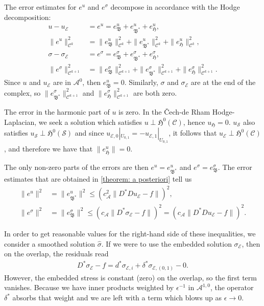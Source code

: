 \documentclass[reqno]{amsart}
\numberwithin{equation}{section}
\theoremstyle{definition}
\newcommand{\Ac}{\mathcal{A}}
\newcommand{\Cc}{\mathcal{C}}
\newcommand{\Ec}{\mathcal{E}}
\newcommand{\Sc}{\mathcal{S}}
\newcommand{\Hf}{\mathfrak{H}}
\newcommand{\Bf}{\mathfrak{B}}
\begin{document}
The error estimates for $e^u$ and $e^\sigma$ decompose in accordance with the Hodge decomposition:
\begin{subequations}
\begin{align}
u - u_\Ec &= e^u = e^u_\Bf + e^u_{\Bf^*}+ e^u_{\Hf}, \\
\|e^u\|^2_{\Cc^k} &= \|e^u_\Bf\|^2_{\Cc^k} + \|e^u_{\Bf^*}\|^2_{\Cc^k} + \|e^u_{\Hf}\|^2_{\Cc^k}, \\
\sigma - \sigma_\Ec &= e^\sigma = e^\sigma_\Bf + e^\sigma_{\Bf^*}+ e^\sigma_{\Hf}, \\
\|e^\sigma\|^2_{\Cc^{k+1}} &= \|e^\sigma_\Bf\|^2_{\Cc^{k+1}} + \|e^\sigma_{\Bf^*}\|^2_{\Cc^{k+1}} + \|e^\sigma_{\Hf}\|^2_{\Cc^{k+1}}.
\end{align}
\end{subequations}
Since $u$ and $u_\Ec$ are in $\Ac^0$, then $e^u_\Bf = 0$. Similarly, $\sigma$ and $\sigma_\Ec$ are at the end of the complex, so $\|e^\sigma_{\Bf^*}\|^2_{\Cc^{k+1}}$ and $\|e^\sigma_{\Hf}\|^2_{\Cc^{k+1}}$ are both zero.

The error in the harmonic part of $u$ is zero. In the \v{C}ech-de Rham Hodge-Laplacian, we seek a solution which satisfies $u \perp \Hf^0(\Cc)$, hence $u_\Hf = 0$. $u_\Sc$ also satisfies $u_\Sc \perp \Hf^0(\Sc)$ and since $u_{\Ec,0}|_{U_{0,1}} = -u_{\Ec,1}|_{U_{0,1}}$, it follows that $u_\Ec \perp \Hf^0(\Cc)$, and therefore we have that $\|e^u_{\Hf}\| = 0$. 

The only non-zero parts of the errors are then $e^u = e^u_{\Bf^*}$ and $e^\sigma = e^\sigma_\Bf$. The error estimates that are obtained in \cref{theorem: a posteriori} tell us
\begin{subequations}
\begin{align}
\|e^u\|^2 &= \|e^u_{\Bf^*}\|^2 \leq \left(c_\Ac^2\|D^*Du_{\Ec} - f \|\right)^2, \label{eq: a posteriori u} \\ 
\|e^\sigma\|^2  &= \|e^\sigma_{\Bf}\|^2 \leq \left(c_\Ac \|D^*\sigma_\Ec - f\| \right)^2 = \left(c_\Ac \|D^*Du_{\Ec} - f\| \right)^2. \label{eq: a posteriori sigma}
\end{align}
\end{subequations}

In order to get reasonable values for the right-hand side of these inequalities, we consider a smoothed solution $\hat\sigma$. If we were to use the embedded solution $\sigma_\Ec$, then on the overlap, the residuals read
\begin{align}    
D^*\sigma_\Ec - f = d^* \sigma_{\Ec,i} +\delta^* \sigma_{\Ec,(0,1)} - 0.
\end{align}
However, the embedded stress is constant (zero) on the overlap, so the first term vanishes. Because we have inner products weighted by $\epsilon^{-1}$ in $\Ac^{1,0}$, the operator $\delta^*$ absorbs that weight and we are left with a term which blows up as $\epsilon \to 0$.
\end{document}
